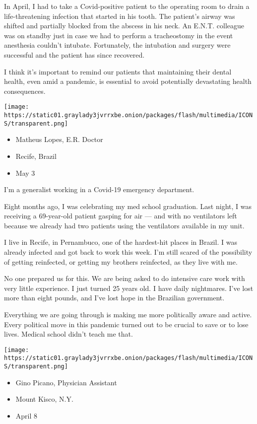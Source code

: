 In April, I had to take a Covid-positive patient to the operating room
to drain a life-threatening infection that started in his tooth. The
patient's airway was shifted and partially blocked from the abscess in
his neck. An E.N.T. colleague was on standby just in case we had to
perform a tracheostomy in the event anesthesia couldn't intubate.
Fortunately, the intubation and surgery were successful and the patient
has since recovered.

I think it's important to remind our patients that maintaining their
dental health, even amid a pandemic, is essential to avoid potentially
devastating health consequences.

\texttt{[image: https://static01.graylady3jvrrxbe.onion/packages/flash/multimedia/ICONS/transparent.png]}

\begin{itemize}
\tightlist
\item
  Matheus Lopes, E.R. Doctor
\item
  Recife, Brazil
\item
  May 3
\end{itemize}

I'm a generalist working in a Covid-19 emergency department.

Eight months ago, I was celebrating my med school graduation. Last
night, I was receiving a 69-year-old patient gasping for air --- and
with no ventilators left because we already had two patients using the
ventilators available in my unit.

I live in Recife, in Pernambuco, one of the hardest-hit places in
Brazil. I was already infected and got back to work this week. I'm still
scared of the possibility of getting reinfected, or getting my brothers
reinfected, as they live with me.

No one prepared us for this. We are being asked to do intensive care
work with very little experience. I just turned 25 years old. I have
daily nightmares. I've lost more than eight pounds, and I've lost hope
in the Brazilian government.

Everything we are going through is making me more politically aware and
active. Every political move in this pandemic turned out to be crucial
to save or to lose lives. Medical school didn't teach me that.

\texttt{[image: https://static01.graylady3jvrrxbe.onion/packages/flash/multimedia/ICONS/transparent.png]}

\begin{itemize}
\tightlist
\item
  Gino Picano, Physician Assistant
\item
  Mount Kisco, N.Y.
\item
  April 8
\end{itemize}

